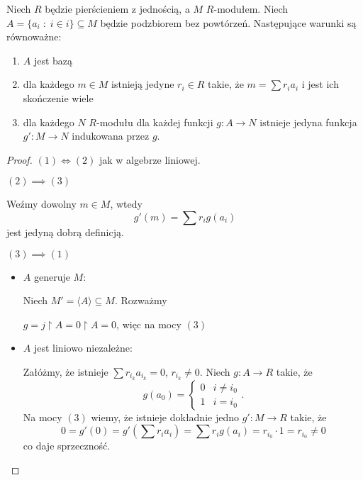 \begin{remark}\label{uwaga:11.4}
  Niech $R$ będzie pierścieniem z jednością, a $M$ $R$-modułem. Niech $A=\{a_i\;:\;i\in i\}\subseteq M$ będzie podzbiorem bez powtórzeń. Następujące warunki są równoważne:
  \begin{enumerate}
    \item $A$ jest bazą
    \item dla każdego $m\in M$ istnieją jedyne $r_i\in R$ takie, że $m=\sum r_ia_i$ i jest ich skończenie wiele
    \item dla każdego $N$ $R$-modułu dla każdej funkcji $g:A\to N$ istnieje jedyna funkcja $g':M\to N$ indukowana przez $g$.
  \end{enumerate}
\end{remark}
\begin{proof}
  $(1)\iff(2)$ jak w algebrze liniowej.

  $(2)\implies(3)$

  Weźmy dowolny $m\in M$, wtedy
  $$g'(m)=\sum r_ig(a_i)$$
  jest jedyną dobrą definicją.

  $(3)\implies(1)$
  \begin{itemize}
    \item $A$ generuje $M$:

      Niech $M'=\langle A\rangle\subseteq M$. Rozważmy 

      \begin{center}\end{center}

      $g=j\restriction A=0\restriction A=0$, więc na mocy $(3)$
      \begin{center}\end{center}
    \item $A$ jest liniowo niezależne:

      Załóżmy, że istnieje $\sum r_{i_k}a_{i_k}=0$, $r_{i_k}\neq 0$. Niech $g:A\to R$ takie, że
      $$g(a_0)=\begin{cases}0&i\neq i_0\\1&i=i_0\end{cases}.$$
      Na mocy $(3)$ wiemy, że istnieje dokładnie jedno $g':M\to R$ takie, że
      $$0=g'(0)=g'(\sum r_ia_i)=\sum r_ig(a_i)=r_{i_0}\cdot 1=r_{i_0}\neq 0$$
      co daje sprzeczność.
  \end{itemize}
\end{proof}

